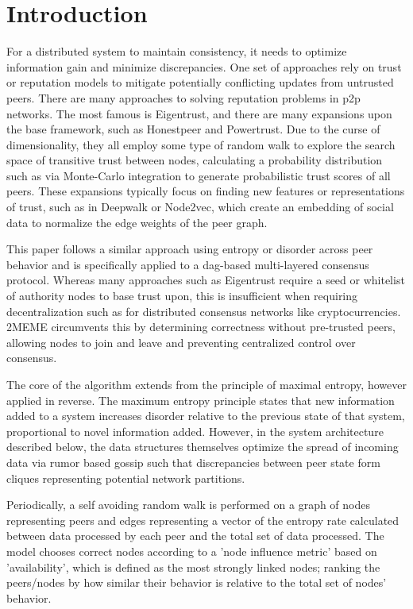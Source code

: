 \documentclass{article}
\begin{document}
\section{Introduction}
For a distributed system to maintain consistency, it needs to optimize information gain and minimize discrepancies. One set of approaches rely on trust or reputation models to mitigate potentially conflicting updates from untrusted peers. There are many approaches to solving reputation problems in p2p networks. The most famous is Eigentrust, and there are many expansions upon the base framework, such as Honestpeer and Powertrust. Due to the curse of dimensionality, they all employ some type of random walk to explore the search space of transitive trust between nodes, calculating a probability distribution such as via Monte-Carlo integration to generate probabilistic trust scores of all peers. These expansions typically focus on finding new features or representations of trust, such as in Deepwalk or Node2vec, which create an embedding of social data to normalize the edge weights of the peer graph.

This paper follows a similar approach using entropy or disorder across peer behavior and is specifically applied to a dag-based multi-layered consensus protocol. Whereas many approaches such as Eigentrust require a seed or whitelist of authority nodes to base trust upon, this is insufficient when requiring decentralization such as for distributed consensus networks like cryptocurrencies. 2MEME circumvents this by determining correctness without pre-trusted peers, allowing nodes to join and leave and preventing centralized control over consensus.

The core of the algorithm extends from the principle of maximal entropy, however applied in reverse. The maximum entropy principle states that new information added to a system increases disorder relative to the previous state of that system, proportional to novel information added. However, in the system architecture described below, the data structures themselves optimize the spread of incoming data via rumor based gossip such that discrepancies between peer state form cliques representing potential network partitions.

Periodically, a self avoiding random walk is performed on a graph of nodes representing peers and edges representing a vector of the entropy rate calculated between data processed by each peer and the total set of data processed. The model chooses correct nodes according to a 'node influence metric' based on 'availability', which is defined as the most strongly linked nodes; ranking the peers/nodes by how similar their behavior is relative to the total set of nodes' behavior.
\end{document}
